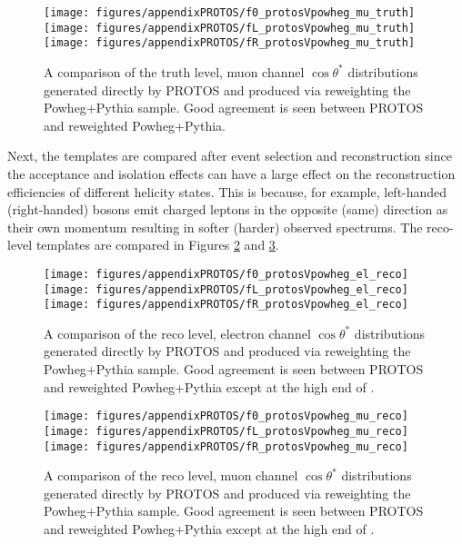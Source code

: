 \begin{figure}[htbp]
\begin{center}
		\texttt{[image: figures/appendixPROTOS/f0\_protosVpowheg\_mu\_truth]}
		\texttt{[image: figures/appendixPROTOS/fL\_protosVpowheg\_mu\_truth]}
		\texttt{[image: figures/appendixPROTOS/fR\_protosVpowheg\_mu\_truth]}
	\caption{A comparison of the truth level, muon channel $\cos\theta^*$ distributions generated directly by PROTOS and produced via reweighting the Powheg+Pythia sample. Good agreement is seen between PROTOS and reweighted Powheg+Pythia.}
	\label{fig:powhegVprotos_mu_truth}
\end{center}	
\end{figure}


Next, the templates are compared after event selection and reconstruction since the acceptance and isolation effects can have a large effect on the reconstruction efficiencies of different helicity states. This is because, for example, left-handed (right-handed) \w bosons emit charged leptons in the opposite (same) direction as their own momentum resulting in softer (harder) observed \pt spectrums. The reco-level templates are compared in Figures \ref{fig:powhegVprotos_el_reco} and \ref{fig:powhegVprotos_mu_reco}.

\begin{figure}[htbp]
\begin{center}
		\texttt{[image: figures/appendixPROTOS/f0\_protosVpowheg\_el\_reco]}
		\texttt{[image: figures/appendixPROTOS/fL\_protosVpowheg\_el\_reco]}
		\texttt{[image: figures/appendixPROTOS/fR\_protosVpowheg\_el\_reco]}
	\caption{A comparison of the reco level, electron channel $\cos\theta^*$ distributions generated directly by PROTOS and produced via reweighting the Powheg+Pythia sample. Good agreement is seen between PROTOS and reweighted Powheg+Pythia except at the high end of \fr.}
	\label{fig:powhegVprotos_el_reco}
\end{center}	
\end{figure}

\begin{figure}[htbp]
\begin{center}
		\texttt{[image: figures/appendixPROTOS/f0\_protosVpowheg\_mu\_reco]}
		\texttt{[image: figures/appendixPROTOS/fL\_protosVpowheg\_mu\_reco]}
		\texttt{[image: figures/appendixPROTOS/fR\_protosVpowheg\_mu\_reco]}
	\caption{A comparison of the reco level, muon channel $\cos\theta^*$ distributions generated directly by PROTOS and produced via reweighting the Powheg+Pythia sample. Good agreement is seen between PROTOS and reweighted Powheg+Pythia except at the high end of \fr.}
	\label{fig:powhegVprotos_mu_reco}
\end{center}	
\end{figure}

